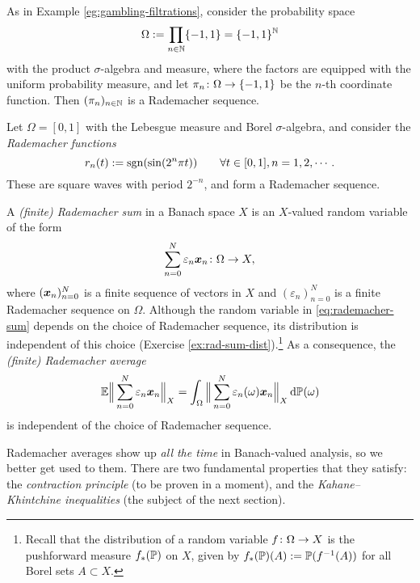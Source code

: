 \begin{example}
  As in Example \ref{eg:gambling-filtrations}, consider the probability space
  \begin{equation*}
    \Omega := \prod_{n \in \N} \{-1,1\} = \{-1,1\}^{\N}
  \end{equation*}
  with the product $\sigma$-algebra and measure, where the factors are equipped with the uniform probability measure, and let $\map{\pi_{n}}{\Omega}{\{-1,1\}}$ be the $n$-th coordinate function.
  Then $(\pi_{n})_{n \in \N}$ is a Rademacher sequence.
\end{example}

\begin{example}
  Let $\Omega = [0,1]$ with the Lebesgue measure and Borel $\sigma$-algebra, and consider the \emph{Rademacher functions}
  \begin{equation*}
    r_n(t) := \sgn(\sin(2^n\pi t)) \qquad \forall t \in [0,1], n = 1,2,\cdots.
  \end{equation*}
  These are square waves with period $2^{-n}$, and form a Rademacher sequence.
\end{example}

A \emph{(finite) Rademacher sum} in a Banach space $X$ is an $X$-valued random variable of the form
\begin{equation}\label{eq:rademacher-sum}
  \sum_{n = 0}^{N} \varepsilon_n \mb{x}_{n} \colon \Omega \to X,
\end{equation}
where $(\mb{x}_{n})_{n = 0}^{N}$ is a finite sequence of vectors in $X$ and $(\varepsilon_{n})_{n = 0}^{N}$ is a finite Rademacher sequence on $\Omega$.
Although the random variable in \eqref{eq:rademacher-sum} depends on the choice of Rademacher sequence, its distribution is independent of this choice (Exercise \ref{ex:rad-sum-dist}).\footnote{Recall that the distribution of a random variable $\map{f}{\Omega}{X}$ is the pushforward measure $f_{*}(\P)$ on $X$, given by $f_{*}(\P)(A) := \P(f^{-1}(A))$ for all Borel sets $A \subset X$.}
As a consequence, the \emph{(finite) Rademacher average}
\begin{equation*}
  \E \Big\| \sum_{n = 0}^{N} \varepsilon_{n} \mb{x}_{n} \Big\|_{X} = \int_{\Omega}  \Big\| \sum_{n = 0}^{N} \varepsilon_{n}(\omega) \mb{x}_{n} \Big\|_{X} \, \dd\P(\omega)
\end{equation*}
is independent of the choice of Rademacher sequence.

Rademacher averages show up \emph{all the time} in Banach-valued analysis, so we better get used to them.
There are two fundamental properties that they satisfy: the \emph{contraction principle} (to be proven in a moment), and the \emph{Kahane--Khintchine inequalities} (the subject of the next section).

